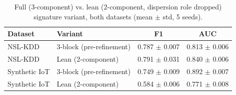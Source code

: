 \begin{table}[t]
\centering
\caption{Full (3-component) vs. lean (2-component, dispersion role dropped) signature variant, both datasets (mean $\pm$ std, 5 seeds).}
\label{tab:variant}
\begin{tabular}{llcc}
\toprule
Dataset & Variant & F1 & AUC \\
\midrule
NSL-KDD & 3-block (pre-refinement) & 0.787 $\pm$ 0.007 & 0.813 $\pm$ 0.006 \\
NSL-KDD & Lean (2-component) & 0.791 $\pm$ 0.031 & 0.840 $\pm$ 0.006 \\
Synthetic IoT & 3-block (pre-refinement) & 0.749 $\pm$ 0.009 & 0.892 $\pm$ 0.007 \\
Synthetic IoT & Lean (2-component) & 0.584 $\pm$ 0.006 & 0.771 $\pm$ 0.008 \\
\bottomrule
\end{tabular}
\end{table}